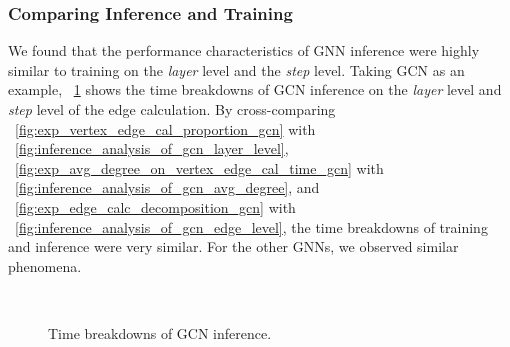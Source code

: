 \subsubsection{Comparing Inference and Training}
\label{sec:time_breakdown_analysis_inference}

%
We found that the performance characteristics of GNN inference were highly similar to training on the \emph{layer} level and the \emph{step} level.
%
Taking GCN as an example, \figurename~\ref{fig:inference_analysis_of_gcn} shows the time breakdowns of GCN inference on the \emph{layer} level and \emph{step} level of the edge calculation.
%
By cross-comparing \figurename~\ref{fig:exp_vertex_edge_cal_proportion_gcn} with \figurename~\ref{fig:inference_analysis_of_gcn_layer_level}, 
\figurename~\ref{fig:exp_avg_degree_on_vertex_edge_cal_time_gcn} with \figurename~\ref{fig:inference_analysis_of_gcn_avg_degree}, and \figurename~\ref{fig:exp_edge_calc_decomposition_gcn} with \figurename~\ref{fig:inference_analysis_of_gcn_edge_level}, the time breakdowns of training and inference were very similar.
%
For the other GNNs, we observed similar phenomena.

\begin{figure}[H]
    \centering
    \\
    \caption{Time breakdowns of GCN inference.}
    \label{fig:inference_analysis_of_gcn}
\end{figure}

